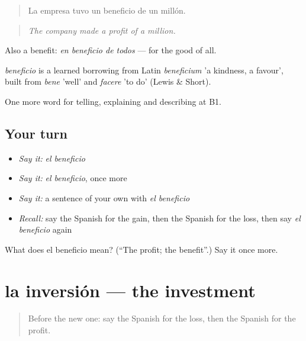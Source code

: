 \begin{quote}
La empresa tuvo un beneficio de un millón.
\end{quote}

\begin{quote}
\emph{The company made a profit of a million.}
\end{quote}

Also a benefit: \emph{en beneficio de todos} — for the good of all.

\begin{cousinweb}
\emph{beneficio} is a learned borrowing from Latin \emph{beneficium} 'a kindness, a favour', built from \emph{bene} 'well' and \emph{facere} 'to do' (Lewis \& Short).
\end{cousinweb}

\begin{grammarlens}[title={What you've built}]
One more word for telling, explaining and describing at B1.
\end{grammarlens}

\subsection*{Your turn}
\begin{itemize}
\raggedright
  \item \emph{Say it:} \emph{el beneficio}
  \item \emph{Say it:} \emph{el beneficio}, once more
  \item \emph{Say it:} a sentence of your own with \emph{el beneficio}
  \item \emph{Recall:} say the Spanish for the gain, then the Spanish for the loss, then say \emph{el beneficio} again
\end{itemize}

\begin{tcolorbox}[breakable,colback=teal!4,colframe=teal!35!black,title={Before you move on}]
What does el beneficio mean? (\textquotedblleft{}The profit; the benefit\textquotedblright{}.) Say it once more.
\end{tcolorbox}
\section[la inversión]{la inversión — the investment}

\label{lesson:ES-C629-inversion}



\begin{quote}
Before the new one: say the Spanish for the loss, then the Spanish for the profit.
\end{quote}

